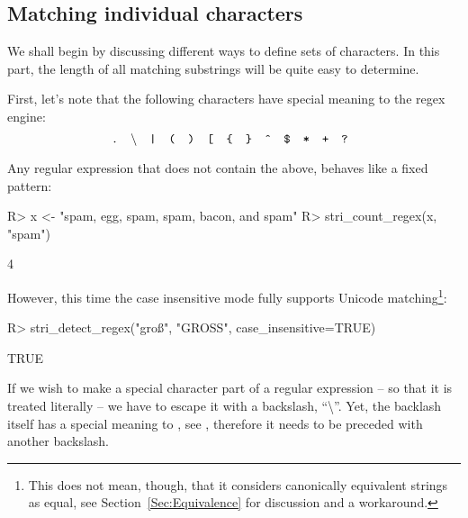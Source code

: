 \documentclass[nojss]{jss}
\begin{document}
\subsection{Matching individual characters}\label{Sec:RegexIndividualChars}

We shall begin by discussing different ways to define sets of characters.
In this part, the length of all matching substrings will be quite
easy to determine.

First, let's note that the following characters have special
meaning to the regex engine:
\[
\text{
  \texttt{.}\quad
  \textbackslash{}\quad
  \texttt{|}\quad
  \texttt{(}\quad
  \texttt{)}\quad
  \texttt{[}\quad
  \texttt{\{}\quad
  \texttt{\}}\quad
  \texttt{\^{}}\quad
  \texttt{\$}\quad
  \texttt{*}\quad
  \texttt{+}\quad
  \texttt{?}\quad
}
\]

Any regular expression that does not contain the above,
behaves like a fixed pattern:

\begin{Schunk}
\begin{Sinput}
R> x <- "spam, egg, spam, spam, bacon, and spam"
R> stri_count_regex(x, "spam")
\end{Sinput}
\begin{Soutput}
[1] 4
\end{Soutput}
\end{Schunk}

However, this time the case insensitive mode fully
supports Unicode matching\footnote{%
This does not mean, though, that it considers canonically
equivalent strings as equal,
see Section~\ref{Sec:Equivalence} for discussion and a workaround.}:

\begin{Schunk}
\begin{Sinput}
R> stri_detect_regex("groß", "GROSS", case_insensitive=TRUE)
\end{Sinput}
\begin{Soutput}
[1] TRUE
\end{Soutput}
\end{Schunk}

If we wish to make a special character part of a regular expression --
so that it is treated literally -- we have to escape it with  a backslash,
``\textbackslash''. Yet, the backlash itself
has a special meaning to , see ,
therefore it needs to be preceded with another backslash.
\end{document}

